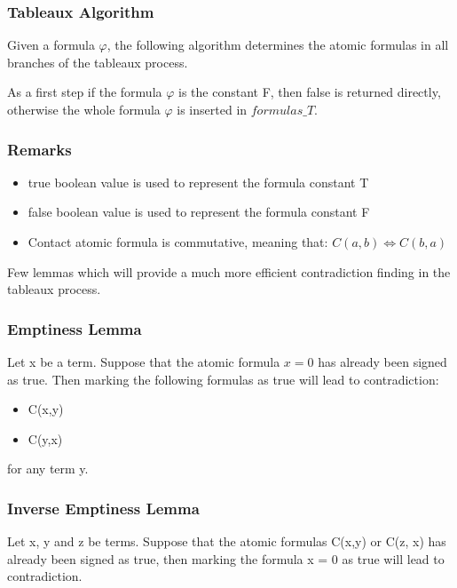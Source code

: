 \documentclass{article}
\begin{document}
	\subsubsection*{Tableaux Algorithm}
	Given a formula $\varphi$, the following algorithm determines the atomic formulas in all branches of the tableaux process.

	As a first step if the formula $\varphi$ is the constant F, then false is returned directly, otherwise the whole formula $\varphi$ is inserted in $formulas\_T$.
	\newline
	\subsubsection*{Remarks}
	\begin{itemize}
		\item true boolean value is used to represent the formula constant T
		\item false boolean value is used to represent the formula constant F
		\item Contact atomic formula is commutative, meaning that: $C(a,b) \iff C(b,a)$
	\end{itemize}

	Few lemmas which will provide a much more efficient contradiction finding in the tableaux process.
	\subsubsection*{Emptiness Lemma}
	Let x be a term. Suppose that the atomic formula $x = 0$ has already been signed as true.
	Then marking the following formulas as true will lead to contradiction:
	\begin{itemize}
		\item C(x,y)
		\item C(y,x)
	\end{itemize}
	for any term y.

	\subsubsection*{Inverse Emptiness Lemma}
	Let x, y and z be terms. Suppose that the atomic formulas C(x,y) or C(z, x) has already been signed as true, then marking the formula x = 0 as true will lead to contradiction.
	\newline
\end{document}
